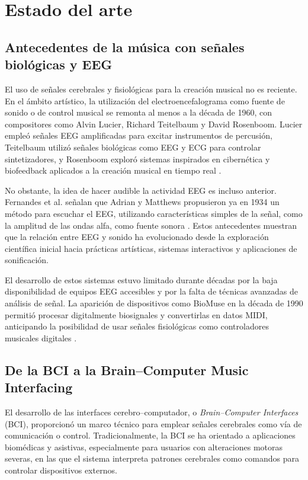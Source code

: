 \documentclass[../main.tex]{subfiles}
\begin{document}
\section{Estado del arte}

\subsection{Antecedentes de la música con señales biológicas y EEG}

El uso de señales cerebrales y fisiológicas para la creación musical no es reciente. En el ámbito artístico, la utilización del electroencefalograma como fuente de sonido o de control musical se remonta al menos a la década de 1960, con compositores como Alvin Lucier, Richard Teitelbaum y David Rosenboom. Lucier empleó señales EEG amplificadas para excitar instrumentos de percusión, Teitelbaum utilizó señales biológicas como EEG y ECG para controlar sintetizadores, y Rosenboom exploró sistemas inspirados en cibernética y biofeedback aplicados a la creación musical en tiempo real \cite{MirandaCastet2014Preface}.

No obstante, la idea de hacer audible la actividad EEG es incluso anterior. Fernandes et al. señalan que Adrian y Matthews propusieron ya en 1934 un método para escuchar el EEG, utilizando características simples de la señal, como la amplitud de las ondas alfa, como fuente sonora \cite{Fernandes2021BraiNSy}. Estos antecedentes muestran que la relación entre EEG y sonido ha evolucionado desde la exploración científica inicial hacia prácticas artísticas, sistemas interactivos y aplicaciones de sonificación.

El desarrollo de estos sistemas estuvo limitado durante décadas por la baja disponibilidad de equipos EEG accesibles y por la falta de técnicas avanzadas de análisis de señal. La aparición de dispositivos como BioMuse en la década de 1990 permitió procesar digitalmente biosignales y convertirlas en datos MIDI, anticipando la posibilidad de usar señales fisiológicas como controladores musicales digitales \cite{MirandaCastet2014Preface}.

\subsection{De la BCI a la Brain--Computer Music Interfacing}

El desarrollo de las interfaces cerebro--computador, o \textit{Brain--Computer Interfaces} (BCI), proporcionó un marco técnico para emplear señales cerebrales como vía de comunicación o control. Tradicionalmente, la BCI se ha orientado a aplicaciones biomédicas y asistivas, especialmente para usuarios con alteraciones motoras severas, en las que el sistema interpreta patrones cerebrales como comandos para controlar dispositivos externos.
\end{document}
